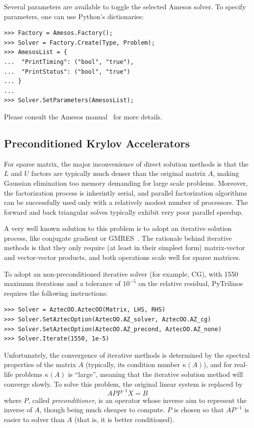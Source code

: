 \documentclass[10pt,relax]{SANDreport}
\begin{document}
Several parameters are available to toggle the selected Amesos solver.
To specify parameters, one can use Python's dictionaries:
\begin{verbatim}
>>> Factory = Amesos.Factory();
>>> Solver = Factory.Create(Type, Problem);
>>> AmesosList = {
...  "PrintTiming": ("bool", "true"),
...  "PrintStatus": ("bool", "true")
... }
...
>>> Solver.SetParameters(AmesosList);
\end{verbatim}
Please consult the Amesos manual~\cite{Amesos-Reference-Guide} for more
details.

\subsection{Preconditioned Krylov Accelerators}
\label{sec:iterative}

For sparse matrix, the major inconvenience of direct solution methods is that
the $L$ and $U$ factors are typically much denser than the original matrix
$A$, making Gaussian elimination too memory demanding for large scale
problems. Moreover, the factorization process is inherintly serial, and
parallel factorization algorithms can be successfully used only with a
relatively modest number of processors. The
forward and back triangular solves typically exhibit very poor parallel speedup.

A very well known solution to this problem is to adopt an iterative solution
process, like conjugate gradient or GMRES~\cite{FIXME}. The rationale behind
iterative methods is that they only require (at least in their simplest form)
matrix-vector and vector-vector products, and both operations scale well for
sparse matrices. 

To adopt an non-preconditioned iterative solver (for example, CG), with 1550
maximum iterations and a tolerance of $10^{-5}$ on the relative residual,
  PyTrilinos requires the following instructions:
\begin{verbatim}
>>> Solver = AztecOO.AztecOO(Matrix, LHS, RHS)
>>> Solver.SetAztecOption(AztecOO.AZ_solver, AztecOO.AZ_cg)
>>> Solver.SetAztecOption(AztecOO.AZ_precond, AztecOO.AZ_none)
>>> Solver.Iterate(1550, 1e-5)
\end{verbatim}

Unfortunately, the convergence of
iterative methods is determined by the spectral properties of the matrix $A$
(typically, its condition number $\kappa(A)$), and for
real-life problems $\kappa(A)$ is ``large'', meaning that the iterative
solution method will converge slowly. To solve this problem,
the original linear system is replaced by 
\[
A P P^{-1} X = B
\]
where $P$, called {\sl preconditioner}, is an operator whose inverse aim to
represent the inverse of $A$, though being much cheaper to compute.
$P$ is chosen so that $AP^{-1}$ is easier to solver than $A$ 
(that is, it is better conditioned). 
\end{document}
